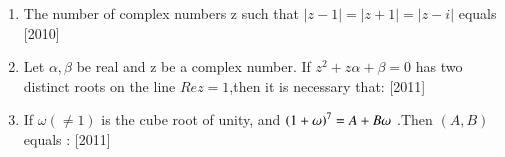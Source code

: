 \documentclass[journal,12pt,twocolumn,article]{IEEEtran}
\theoremstyle{remark}
\begin{document}
\begin{enumerate}[start = 14]
\begin{enumerate}
\end{enumerate}

\item The number of complex numbers z such that $|z-1|=|z+1|=|z-i|$ equals
\hfill{[2010]}

\begin{enumerate}
\end{enumerate}

\item Let $\alpha,\beta$ be real and z be a complex number. If $z^2 +z\alpha +\beta =0$  has two distinct roots on the line $Rez=1$,then it is necessary that:
\hfill{[2011]}
\begin{enumerate}
\end{enumerate}

\item If $\omega(\neq1)$ is the cube root of unity, and $\left(1+\omega \right)^7= A+ B\omega$ .Then $(A,B)$ equals :
\hfill{[2011]}                                     


\end{enumerate}
\end{document}
